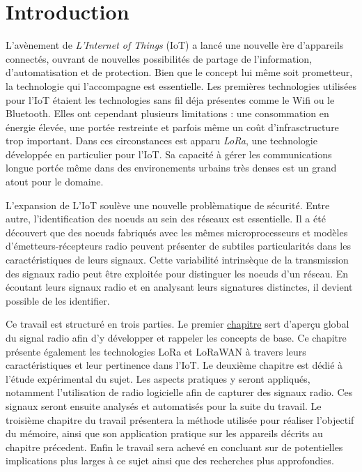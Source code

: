 

\chapter*{Introduction}

\renewcommand{\leftmark}{INTRODUCTION}

L'avènement de \textit{L'Internet of Things} (IoT) a lancé une nouvelle ère d'appareils connectés, ouvrant de nouvelles possibilités de partage de l'information, d'automatisation et de protection. Bien que le concept lui même soit prometteur, la technologie qui l'accompagne est essentielle.
Les premières technologies utilisées pour l'IoT étaient les technologies sans fil déja présentes comme le Wifi ou le Bluetooth. Elles ont cependant plusieurs limitations : une consommation en énergie élevée, une portée restreinte et parfois même un coût d'infrasctructure trop important.
Dans ces circonstances est apparu \textit{LoRa}, une technologie développée en particulier pour l'IoT. Sa capacité à gérer les communications longue portée même dans des environements urbains très denses est un grand atout pour le domaine.

\vspace{0.1cm}

L'expansion de L'IoT soulève une nouvelle problèmatique de sécurité. Entre autre, l'identification des noeuds au sein des réseaux est essentielle. Il a été dé\-couvert que des noeuds fabriqués avec les mêmes microprocesseurs et modèles d'émetteurs-récepteurs radio peuvent présenter de subtiles particularités dans les caractéristiques de leurs signaux. Cette variabilité intrinsèque de la transmission des signaux radio peut être exploitée pour distinguer les noeuds d’un réseau. En écoutant leurs signaux radio et en analysant leurs signatures distinctes, il devient possible de les identifier.

\vspace{0.1cm}

Ce travail est structuré en trois parties. Le premier          \hyperref[chap1]{chapitre} sert d'aperçu global du signal radio afin d'y développer et rappeler les concepts de base. Ce chapitre présente également les technologies LoRa et LoRaWAN à travers leurs caractéristiques et leur pertinence dans l'IoT.
Le deuxième chapitre est dédié à l'étude expérimental du sujet. Les aspects pratiques y seront appliqués, notamment l'utilisation de radio logicielle afin de capturer des signaux radio. Ces signaux seront ensuite analysés et automatisés pour la suite du travail.
Le troisième chapitre du travail présentera la méthode utilisée pour réaliser l'objectif du mémoire, ainsi que son application pratique sur les appareils décrits au chapitre précedent. Enfin le travail sera achevé en concluant sur de potentielles implications plus larges à ce sujet ainsi que des recherches plus approfondies.

